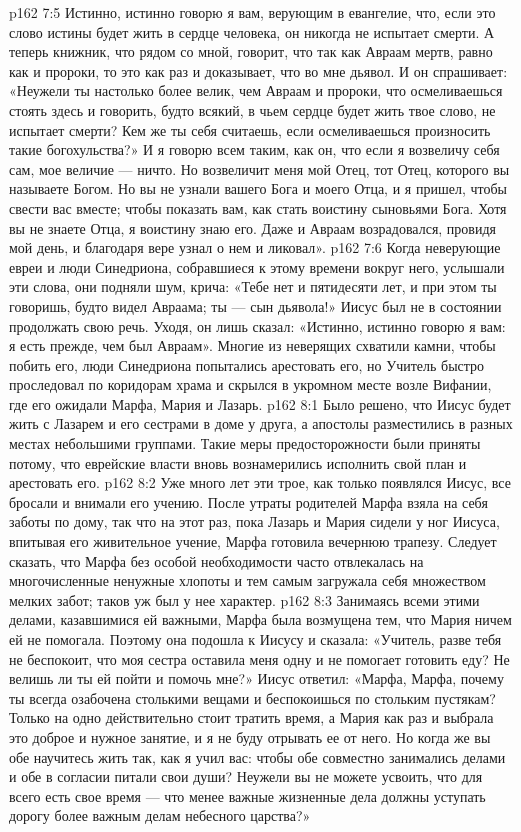 \vs p162 7:5 Истинно, истинно говорю я вам, верующим в евангелие, что, если это слово истины будет жить в сердце человека, он никогда не испытает смерти. А теперь книжник, что рядом со мной, говорит, что так как Авраам мертв, равно как и пророки, то это как раз и доказывает, что во мне дьявол. И он спрашивает: «Неужели ты настолько более велик, чем Авраам и пророки, что осмеливаешься стоять здесь и говорить, будто всякий, в чьем сердце будет жить твое слово, не испытает смерти? Кем же ты себя считаешь, если осмеливаешься произносить такие богохульства?» И я говорю всем таким, как он, что если я возвеличу себя сам, мое величие --- ничто. Но возвеличит меня мой Отец, тот Отец, которого вы называете Богом. Но вы не узнали вашего Бога и моего Отца, и я пришел, чтобы свести вас вместе; чтобы показать вам, как стать воистину сыновьями Бога. Хотя вы не знаете Отца, я воистину знаю его. Даже и Авраам возрадовался, провидя мой день, и благодаря вере узнал о нем и ликовал».
\vs p162 7:6 \pc Когда неверующие евреи и люди Синедриона, собравшиеся к этому времени вокруг него, услышали эти слова, они подняли шум, крича: «Тебе нет и пятидесяти лет, и при этом ты говоришь, будто видел Авраама; ты --- сын дьявола!» Иисус был не в состоянии продолжать свою речь. Уходя, он лишь сказал: «Истинно, истинно говорю я вам: я есть прежде, чем был Авраам». Многие из неверящих схватили камни, чтобы побить его, люди Синедриона попытались арестовать его, но Учитель быстро проследовал по коридорам храма и скрылся в укромном месте возле Вифании, где его ожидали Марфа, Мария и Лазарь.
\vs p162 8:1 Было решено, что Иисус будет жить с Лазарем и его сестрами в доме у друга, а апостолы разместились в разных местах небольшими группами. Такие меры предосторожности были приняты потому, что еврейские власти вновь вознамерились исполнить свой план и арестовать его.
\vs p162 8:2 Уже много лет эти трое, как только появлялся Иисус, все бросали и внимали его учению. После утраты родителей Марфа взяла на себя заботы по дому, так что на этот раз, пока Лазарь и Мария сидели у ног Иисуса, впитывая его живительное учение, Марфа готовила вечернюю трапезу. Следует сказать, что Марфа без особой необходимости часто отвлекалась на многочисленные ненужные хлопоты и тем самым загружала себя множеством мелких забот; таков уж был у нее характер.
\vs p162 8:3 Занимаясь всеми этими делами, казавшимися ей важными, Марфа была возмущена тем, что Мария ничем ей не помогала. Поэтому она подошла к Иисусу и сказала: «Учитель, разве тебя не беспокоит, что моя сестра оставила меня одну и не помогает готовить еду? Не велишь ли ты ей пойти и помочь мне?» Иисус ответил: «Марфа, Марфа, почему ты всегда озабочена столькими вещами и беспокоишься по стольким пустякам? Только на одно действительно стоит тратить время, а Мария как раз и выбрала это доброе и нужное занятие, и я не буду отрывать ее от него. Но когда же вы обе научитесь жить так, как я учил вас: чтобы обе совместно занимались делами и обе в согласии питали свои души? Неужели вы не можете усвоить, что для всего есть свое время --- что менее важные жизненные дела должны уступать дорогу более важным делам небесного царства?»
